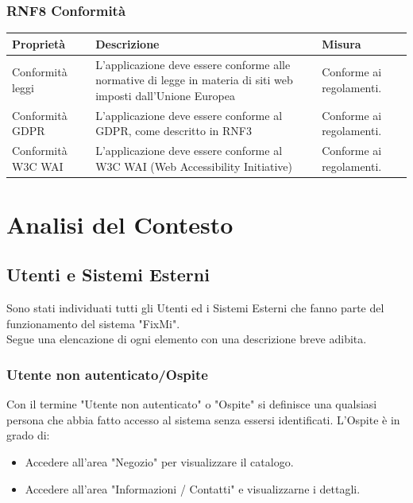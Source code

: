 \documentclass{report}
\begin{document}
\subsection*{RNF8 Conformità}
\begin{center} %
	\centering
	\begin{tabular}{ |p{3cm}|p{4cm}|p{4cm}|  }
		\hline
		\centering Proprietà & \qquad\quad Descrizione & \qquad\qquad Misura\\ %
		\hline
		Conformità leggi & L'applicazione deve essere conforme alle normative di legge in materia di siti web imposti dall'Unione Europea & Conforme ai regolamenti. \\
		\hline
		Conformità GDPR & L'applicazione deve essere conforme al GDPR, come descritto in RNF3 & Conforme ai regolamenti.\\
		\hline
		Conformità W3C WAI & L'applicazione deve essere conforme al W3C WAI (Web Accessibility Initiative) & Conforme ai regolamenti.\\ 
		\hline
	\end{tabular}

\end{center}


\chapter{Analisi del Contesto}

\section{Utenti e Sistemi Esterni}

Sono stati individuati tutti gli Utenti ed i Sistemi Esterni che fanno parte del funzionamento del sistema "FixMi".\\Segue una elencazione di ogni elemento con una descrizione breve adibita.


\subsection*{Utente non autenticato/Ospite}
Con il termine "Utente non autenticato" o "Ospite" si definisce una qualsiasi persona che abbia fatto accesso al sistema senza essersi identificati. L'Ospite è in grado di:
\begin{itemize}
	\item Accedere all'area "Negozio" per visualizzare il catalogo.
	\item Accedere all'area "Informazioni / Contatti" e visualizzarne i dettagli. 
\end{itemize}
\end{document}
